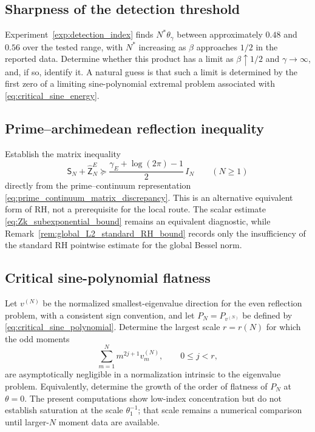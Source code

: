 \documentclass[11pt]{amsart}
\numberwithin{equation}{section}
\theoremstyle{plain}
\theoremstyle{definition}
\theoremstyle{remark}
\newcommand{\RH}{\mathrm{RH}}
\begin{document}
\subsection{Sharpness of the detection threshold}
\label{ques:detection_threshold}
Experiment~\ref{exp:detection_index} finds $N^*\theta_\gamma$ between approximately
$0.48$ and $0.56$ over the tested range, with $N^*$ increasing as $\beta$ approaches
$1/2$ in the reported data.  Determine whether this product has a limit as
$\beta\uparrow1/2$ and $\gamma\to\infty$, and, if so, identify it.  A natural guess is that
such a limit is determined by the first zero of a limiting sine-polynomial extremal
problem associated with \eqref{eq:critical_sine_energy}.

\subsection{Prime--archimedean reflection inequality}
\label{ques:prime_laguerre_subexponential}
Establish the matrix inequality
\begin{equation}
 \mathsf S_N+\widehat{\mathsf Z}_N^E
 \succeq
 \frac{\gamma_E+\log(2\pi)-1}{2}\,I_N
 \qquad(N\ge1)
\end{equation}
directly from the prime--continuum representation
\eqref{eq:prime_continuum_matrix_discrepancy}.  This is an alternative equivalent form of
$\RH$, not a prerequisite for the local route.  The scalar estimate
\eqref{eq:Zk_subexponential_bound} remains an equivalent diagnostic, while
Remark~\ref{rem:global_L2_standard_RH_bound} records only the insufficiency of the standard
RH pointwise estimate for the global Bessel norm.

\subsection{Critical sine-polynomial flatness}
\label{ques:critical_vector_scaling}
Let $v^{(N)}$ be the normalized smallest-eigenvalue direction for the even reflection
problem, with a consistent sign convention, and let $P_N=P_{v^{(N)}}$ be defined by
\eqref{eq:critical_sine_polynomial}.  Determine the largest scale $r=r(N)$ for which the
odd moments
\begin{equation}
 \sum_{m=1}^N m^{2j+1}v_m^{(N)},
 \qquad 0\le j<r,
 \label{eq:critical_flatness_open_moments}
\end{equation}
are asymptotically negligible in a normalization intrinsic to the eigenvalue problem.
Equivalently, determine the growth of the order of flatness of $P_N$ at $\theta=0$.  The
present computations show low-index concentration but do not establish saturation at the
scale $\theta_1^{-1}$; that scale remains a numerical comparison until larger-$N$ moment
data are available.
\end{document}
